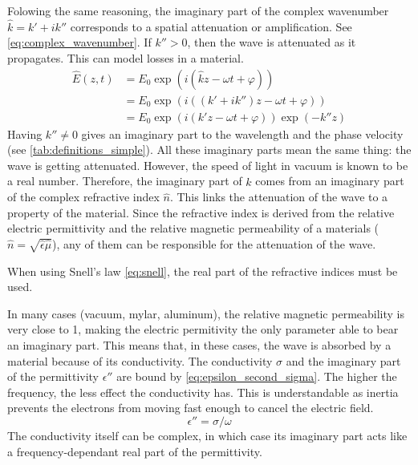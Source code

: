 Folowing the same reasoning, the imaginary part of the complex wavenumber $\hat{k} = k' + i k''$ corresponds to a spatial attenuation or amplification.
See \cref{eq:complex_wavenumber}.
If $k''> 0$, then the wave is attenuated as it propagates.
This can model losses in a material.
\begin{subequations}
    \begin{align}
       \hat{E}(z, t) &=
       E_0 \exp(i(\hat{k}z - \omega t + \varphi))
       \\
       &=
       E_0 \exp(i((k' + i k'')z - \omega t + \varphi))
       \\
       &=
       E_0 \exp(i(k' z - \omega t + \varphi)) \exp(-k'' z)
    \end{align}
    \label{eq:complex_wavenumber}
\end{subequations}
Having $k'' \ne 0$ gives an imaginary part to the wavelength and the phase velocity
(see \cref{tab:definitions_simple}).
All these imaginary parts mean the same thing: the wave is getting attenuated.
However, the speed of light in vacuum is known to be a real number.
Therefore, the imaginary part of $\hat{k}$ comes from an imaginary part of the complex refractive index $\hat{n}$.
This links the attenuation of the wave to a property of the material.
Since the refractive index is derived from the relative electric permittivity and the relative magnetic permeability of a materials
($\hat{n}=\sqrt{\hat{\epsilon}\hat{\mu}}$),
any of them can be responsible for the attenuation of the wave.

When using Snell's law \eqref{eq:snell}, the real part of the refractive indices must be used.

In many cases (vacuum, mylar, aluminum), the relative magnetic permeability is very close to 1, making the electric permitivity the only parameter able to bear an imaginary part.
This means that, in these cases, the wave is absorbed by a material because of its conductivity.
The conductivity $\sigma$ and the imaginary part of the permittivity $\epsilon''$ are bound by \cref{eq:epsilon_second_sigma}.
The higher the frequency, the less effect the conductivity has.
This is understandable as inertia prevents the electrons from moving fast enough to cancel the electric field.
\begin{equation}   
    \epsilon'' = \sigma / \omega
    \label{eq:epsilon_second_sigma}
\end{equation}
The conductivity itself can be complex, in which case its imaginary part acts like a frequency-dependant real part of the permittivity.

